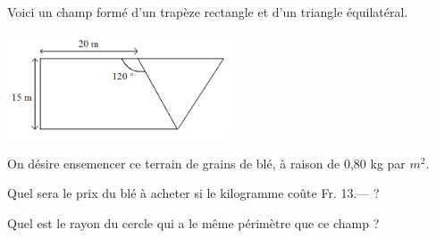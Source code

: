 \begin{exercice}
Voici un champ formé d'un trapèze rectangle et d'un triangle équilatéral.
\begin{center}
\includegraphics[width = 0.5\textwidth]{trigo/image/trigo19.png}
\end{center}
On désire ensemencer ce terrain de grains de blé, à raison de 0,80 kg par $m^2$. 

Quel sera le prix du blé à acheter si le kilogramme coûte Fr. 13.— ?

Quel est le rayon du cercle qui a le même périmètre que ce champ ? 
\end{exercice}
